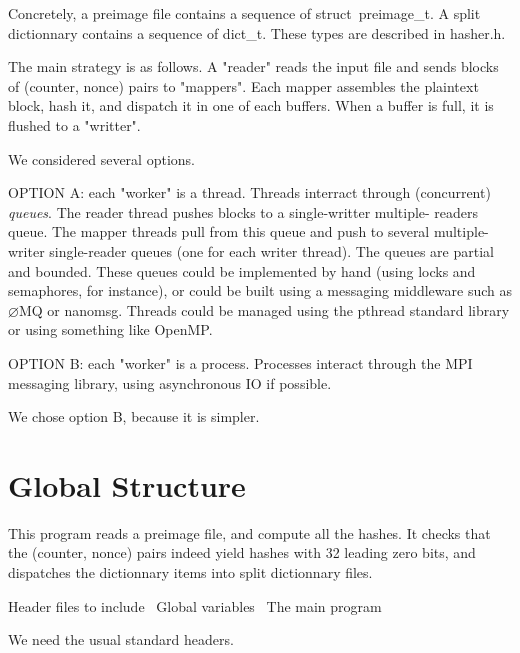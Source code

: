 \documentclass{article}%
\newcommand{\ZMQ}{\textsf{$\varnothing$MQ}\xspace}
\newcommand{\NN}{\textsf{nanomsg}\xspace}
\newcommand{\MPI}{\textsf{MPI}\xspace}
\newcommand{\OMP}{\textsf{OpenMP}\xspace}
\begin{document}
Concretely, a preimage file contains a sequence of {\Tt{}struct\ preimage{\_}t\nwendquote}. A
split dictionnary contains a sequence of {\Tt{}dict{\_}t\nwendquote}. These types are described in {\Tt{}hasher.h\nwendquote}.


The main strategy is as follows. A "reader" reads the input file and sends
blocks of (counter, nonce) pairs to "mappers". Each mapper assembles the
plaintext block, hash it, and dispatch it in one of each buffers. When a
buffer is full, it is flushed to a "writter".

We considered several options. 

OPTION A: each "worker" is a thread. Threads interract through (concurrent)
\emph{queues}. The reader thread pushes blocks to a single-writter multiple-
readers queue. The mapper threads pull from this queue and push to several
multiple-writer single-reader queues (one for each writer thread). The queues
are partial and bounded. These queues could be implemented by hand (using
locks and semaphores, for instance), or could be built using a messaging
middleware such as \ZMQ or \NN. Threads could be managed using the {\Tt{}pthread\nwendquote}
standard library or using something like \OMP.

OPTION B: each "worker" is a process. Processes interact through the \MPI
messaging library, using asynchronous IO if possible.

We chose option B, because it is simpler.

\section{Global Structure}

This program reads a preimage file, and compute all the hashes. It checks that
the (counter, nonce) pairs indeed yield hashes with 32 leading zero bits, and
dispatches the dictionnary items into split dictionnary files.

\nwenddocs{}\endmoddef\nwstartdeflinemarkup\nwenddeflinemarkup
\LA{}Header files to include~{\nwtagstyle{}}\RA{}
\LA{}Global variables~{\nwtagstyle{}}\RA{}
\LA{}The main program~{\nwtagstyle{}}\RA{}

\nwnotused{*}\nwendcode{}We need the usual standard headers.
\end{document}
